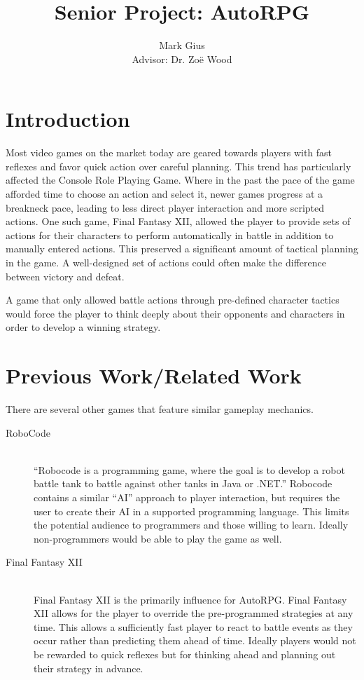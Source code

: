 \documentclass[11pt]{article}
\begin{document}
\author{Mark Gius\vspace{10pt} \\
        Advisor: Dr. Zo\"e Wood
        }
\title{Senior Project: AutoRPG}
\maketitle

\section{Introduction}

Most video games on the market today are geared towards players with fast reflexes and favor quick action over careful planning. This trend has particularly affected the Console Role Playing Game.  Where in the past the pace of the game afforded time to choose an action and select it, newer games progress at a breakneck pace, leading to less direct player interaction and more scripted actions.  One such game, Final Fantasy XII, allowed the player to provide sets of actions for their characters to perform automatically in battle in addition to manually entered actions. \cite{Gambits} This preserved a significant amount of tactical planning in the game. A well-designed set of actions could often make the difference between victory and defeat.

A game that only allowed battle actions through pre-defined character tactics would force the player to think deeply about their opponents and characters in order to develop a winning strategy. 

\section{Previous Work/Related Work}

There are several other games that feature similar gameplay mechanics.  

\begin{description}
\item[RoboCode \cite{RoboCode}] \hfill \\
      ``Robocode is a programming game, where the goal is to develop a robot battle tank to battle against other tanks in Java or .NET.'' Robocode contains a similar ``AI'' approach to player interaction, but requires the user to create their AI in a supported programming language.  This limits the potential audience to programmers and those willing to learn.  Ideally non-programmers would be able to play the game as well.

\item[Final Fantasy XII \cite{Gambits}] \hfill \\
      Final Fantasy XII is the primarily influence for AutoRPG. Final Fantasy XII allows for the player to override the pre-programmed strategies at any time.  This allows a sufficiently fast player to react to battle events as they occur rather than predicting them ahead of time.  Ideally players would not be rewarded to quick reflexes but for thinking ahead and planning out their strategy in advance.

\end{description}
\end{document}
